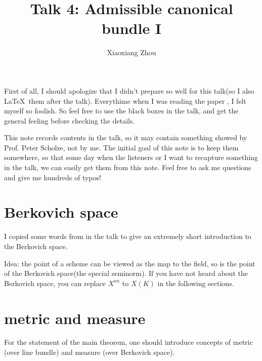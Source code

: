 \documentclass[reqno,11pt]{amsart}
\numberwithin{equation}{section}
\theoremstyle{plain}
\theoremstyle{plain}
\numberwithin{equation}{section}
\theoremstyle{remark}
\begin{document}
\date{}

\title
{Talk 4: Admissible canonical bundle I
}


\author{Xiaoxiang Zhou}
\address{School of Mathematical Sciences\\
University of Bonn\\
Bonn, 53115\\ Germany\\} 



\setcounter{tocdepth}{1}
\maketitle
\tableofcontents

First of all, I should apologize that I didn't prepare so well for this talk(so I also \LaTeX$\,$ them after the talk). Everythime when I was reading the paper \cite{yuan2021arithmetic}, I felt myself so foolish. So feel free to use the black boxes in the talk, and get the general feeling before checking the details.

This note records contents in the talk, so it may contain something showed by Prof. Peter Scholze, not by me. The initial goal of this note is to keep them somewhere, so that some day when the listeners or I want to recapture something in the talk, we can easily get them from this note. Feel free to ask me questions and give me hundreds of typos!

\section{Berkovich space}

I copied some words from \cite[3.1.1]{yuan2021adelic} in the talk to give an extremely short introduction to the Berkovich space. 

Idea: the point of a scheme can be viewed as the map to the field, so is the point of the Berkovich space(the special seminorm). If you have not heard about the Berkovich space, you can replace $X^{an}$ to $X(K)$ in the following sections.

\section{metric and measure}
For the statement of the main theorem, one should introduce concepts of metric (over line bundle) and measure (over Berkovich space).
\end{document}
